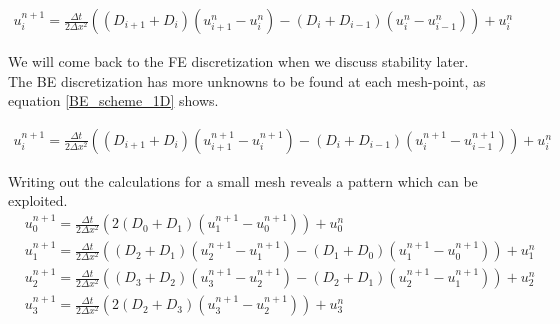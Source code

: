 \begin{align}\label{FE_scheme_1D}
 u^{n+1}_i = \frac{\Delta t}{2\Delta x^2}\left((D_{i+1}+D_{i})(u^n_{i+1}-u^n_{i})-(D_{i}+D_{i-1})(u^n_{i}-u^n_{i-1})\right) + u^n_i
\end{align}

We will come back to the FE discretization when we discuss stability later. \\
The BE discretization has more unknowns to be found at each mesh-point, as equation \ref{BE_scheme_1D} shows.

\begin{align}\label{BE_scheme_1D}
 u^{n+1}_i = \frac{\Delta t}{2\Delta x^2}\left((D_{i+1}+D_{i})(u^{n+1}_{i+1}-u^{n+1}_{i})-(D_{i}+D_{i-1})(u^{n+1}_{i}-u^{n+1}_{i-1})\right) + u^n_i
\end{align}

Writing out the calculations for a small mesh reveals a pattern which can be exploited.
\begin{align*}
 &u^{n+1}_0 =  \frac{\Delta t}{2\Delta x^2}\left(2(D_{0}+D_{1})(u^{n+1}_{1}-u^{n+1}_{0})\right) + u^n_0\\
 &u^{n+1}_1 = \frac{\Delta t}{2\Delta x^2}\left((D_{2}+D_{1})(u^{n+1}_{2}-u^{n+1}_{1})-(D_{1}+D_{0})(u^{n+1}_{1}-u^{n+1}_{0})\right) + u^n_1\\
 &u^{n+1}_2 = \frac{\Delta t}{2\Delta x^2}\left((D_{3}+D_{2})(u^{n+1}_{3}-u^{n+1}_{2})-(D_{2}+D_{1})(u^{n+1}_{2}-u^{n+1}_{1})\right) + u^n_2 \\
 &u^{n+1}_3 =  \frac{\Delta t}{2\Delta x^2}\left(2(D_{2}+D_{3})(u^{n+1}_{3}-u^{n+1}_{2})\right) + u^n_3
\end{align*}

